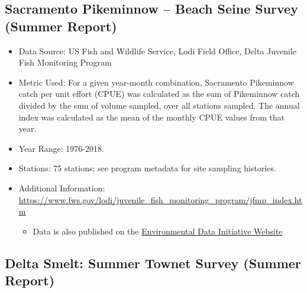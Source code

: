 \documentclass[
]{book}
\providecommand{\tightlist}{%
  \setlength{\itemsep}{0pt}\setlength{\parskip}{0pt}}
\begin{document}
\hypertarget{sacramento-pikeminnow-beach-seine-survey-summer-report}{%
\subsection{Sacramento Pikeminnow -- Beach Seine Survey (Summer Report)}\label{sacramento-pikeminnow-beach-seine-survey-summer-report}}

\begin{itemize}
\tightlist
\item
  Data Source: US Fish and Wildlife Service, Lodi Field Office, Delta Juvenile Fish Monitoring Program
\item
  Metric Used: For a given year-month combination, Sacramento Pikeminnow catch per unit effort (CPUE) was calculated as the sum of Pikeminnow catch divided by the sum of volume sampled, over all stations sampled. The annual index was calculated as the mean of the monthly CPUE values from that year.
\item
  Year Range: 1976-2018.
\item
  Stations: 75 stations; see program metadata for site sampling histories.
\item
  Additional Information: \url{https://www.fws.gov/lodi/juvenile_fish_monitoring_program/jfmp_index.htm}

  \begin{itemize}
  \tightlist
  \item
    Data is also published on the \href{https://portal.edirepository.org/nis/mapbrowse?packageid=edi.244.4}{Environmental Data Initiative Website}
  \end{itemize}
\end{itemize}

\hypertarget{delta-smelt-summer-townet-survey-summer-report}{%
\subsection{Delta Smelt: Summer Townet Survey (Summer Report)}\label{delta-smelt-summer-townet-survey-summer-report}}
\end{document}
